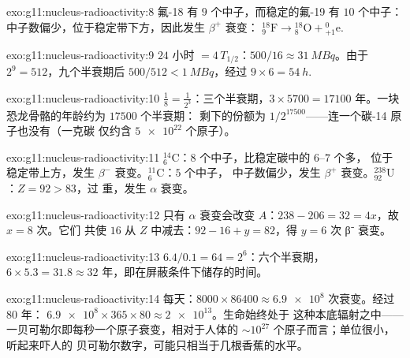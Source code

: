 \begin{solution}{exo:g11:nucleus-radioactivity:8}
氟-18 有 $9$ 个中子，而稳定的氟-19 有 $10$ 个中子：
中子数偏少，位于稳定带下方，因此发生 $\beta^+$ 衰变：
${}^{18}_{9}\mathrm{F} \to {}^{18}_{8}\mathrm{O} + {}^{0}_{+1}\mathrm{e}$.
\end{solution}

\begin{solution}{exo:g11:nucleus-radioactivity:9}
$24$ 小时 $= 4\,T_{1/2}$：$500/16 \approx \qty{31}{MBq}$。由于
$2^9 = 512$，九个半衰期后 $500/512 < \qty{1}{MBq}$，经过
$9 \times 6 = \qty{54}{h}$.
\end{solution}

\begin{solution}{exo:g11:nucleus-radioactivity:10}
$\frac18 = \frac1{2^3}$：三个半衰期，$3 \times \num{5700} =
\num{17100}$ 年。一块恐龙骨骼的年龄约为 $\num{17500}$ 个半衰期：
剩下的份额为 $1/2^{17500}$——连一个碳-14 原子也没有（一克碳
仅约含 $\num{5e22}$ 个原子）。
\end{solution}

\begin{solution}{exo:g11:nucleus-radioactivity:11}
${}^{14}_{6}\mathrm{C}$：$8$ 个中子，比稳定碳中的 $6$--$7$ 个多，
位于稳定带上方，发生 $\beta^-$ 衰变。${}^{11}_{6}\mathrm{C}$：$5$ 个中子，
中子数偏少，发生 $\beta^+$ 衰变。${}^{238}_{92}\mathrm{U}$：$Z = 92 > 83$，过
重，发生 $\alpha$ 衰变。
\end{solution}

\begin{solution}{exo:g11:nucleus-radioactivity:12}
只有 $\alpha$ 衰变会改变 $A$：$238 - 206 = 32 = 4x$，故 $x = 8$ 次。它们
共使 $16$ 从 $Z$ 中减去：$92 - 16 + y = 82$，得 $y = 6$ 次 β⁻ 衰变。
\end{solution}

\begin{solution}{exo:g11:nucleus-radioactivity:13}
$6.4/0.1 = 64 = 2^{6}$：六个半衰期，$6 \times 5.3 = 31.8 \approx 32$
年，即在屏蔽条件下储存的时间。
\end{solution}

\begin{solution}{exo:g11:nucleus-radioactivity:14}
每天：$8000 \times 86400 \approx \num{6.9e8}$ 次衰变。经过 $80$ 年：
$\num{6.9e8} \times 365 \times 80 \approx \num{2e13}$。生命始终处于
这种本底辐射之中——一贝可勒尔即每秒一个原子衰变，相对于人体的
$\sim 10^{27}$ 个原子而言；单位很小，听起来吓人的
贝可勒尔数字，可能只相当于几根香蕉的水平。
\end{solution}

